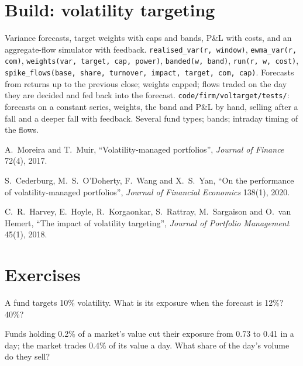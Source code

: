 \section{Build: volatility targeting}\label{bld:s1:volatility-targeting-and-risk-managed-portfolios:voltarget}

\begin{build}
 Variance forecasts, target weights with caps and bands, P\&L with costs, and an aggregate-flow simulator with feedback.
 \texttt{realised\_var(r, window)}, \texttt{ewma\_var(r, com)}, \texttt{weights(var, target, cap, power)}, \texttt{banded(w, band)},
\texttt{run(r, w, cost)}, \texttt{spike\_flows(base, share, turnover, impact, target, com, cap)}.
 Forecasts from returns up to the previous close; weights capped; flows traded on the day they are decided and fed back into the forecast.
 \texttt{code/firm/voltarget/tests/}: forecasts on a constant series, weights, the band and P\&L by hand, selling after a fall
and a deeper fall with feedback.
 Several fund types; bands; intraday timing of the flows.
\end{build}

\begin{omsources}
\item A.~Moreira and T.~Muir, ``Volatility-managed portfolios'', \emph{Journal of Finance} 72(4), 2017.
\item S.~Cederburg, M.~S.~O'Doherty, F.~Wang and X.~S.~Yan, ``On the performance of volatility-managed portfolios'', \emph{Journal of Financial
Economics} 138(1), 2020.
\item C.~R.~Harvey, E.~Hoyle, R.~Korgaonkar, S.~Rattray, M.~Sargaison and O.~van Hemert, ``The impact of volatility targeting'', \emph{Journal of
Portfolio Management} 45(1), 2018.
\end{omsources}

\section{Exercises}

\begin{exercise}[$\star$]\label{exo:s1:volatility-targeting-and-risk-managed-portfolios:1}
A fund targets 10\% volatility. What is its exposure when the forecast is 12\%? 40\%?
\end{exercise}

\begin{exercise}[$\star$]\label{exo:s1:volatility-targeting-and-risk-managed-portfolios:2}
Funds holding 0.2\% of a market's value cut their exposure from 0.73 to 0.41 in a day; the market trades 0.4\% of its value a day. What share of the
day's volume do they sell?
\end{exercise}

